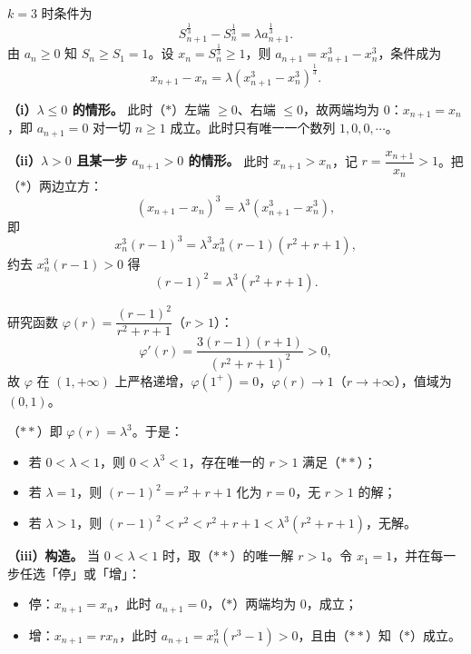 \begin{answer}

$k=3$ 时条件为
\nopagebreak[4]
\[S_{n+1}^{\frac13}-S_n^{\frac13}=\lambda a_{n+1}^{\frac13}.\]
由 $a_n\geqslant0$ 知 $S_n\geqslant S_1=1$。设 $x_n=S_n^{\frac13}\geqslant1$，则 $a_{n+1}=x_{n+1}^3-x_n^3$，条件成为
\nopagebreak[4]
\[x_{n+1}-x_n=\lambda\left(x_{n+1}^3-x_n^3\right)^{\frac13}. \tag{$\ast$}\]

\textbf{（i）$\lambda\leqslant0$ 的情形。} 此时（$\ast$）左端 $\geqslant0$、右端 $\leqslant0$，故两端均为 $0$：$x_{n+1}=x_n$，即 $a_{n+1}=0$ 对一切 $n\geqslant1$ 成立。此时只有唯一一个数列 $1,0,0,\cdots$。

\textbf{（ii）$\lambda>0$ 且某一步 $a_{n+1}>0$ 的情形。} 此时 $x_{n+1}>x_n$，记 $r=\dfrac{x_{n+1}}{x_n}>1$。把（$\ast$）两边立方：
\nopagebreak[4]
\[\left(x_{n+1}-x_n\right)^3=\lambda^3\left(x_{n+1}^3-x_n^3\right),\]
即
\nopagebreak[4]
\[x_n^3(r-1)^3=\lambda^3x_n^3(r-1)\left(r^2+r+1\right),\]
约去 $x_n^3(r-1)>0$ 得
\nopagebreak[4]
\[(r-1)^2=\lambda^3\left(r^2+r+1\right). \tag{$\ast\ast$}\]

研究函数 $\varphi(r)=\dfrac{(r-1)^2}{r^2+r+1}$（$r>1$）：
\nopagebreak[4]
\[\varphi'(r)=\frac{3(r-1)(r+1)}{\left(r^2+r+1\right)^2}>0,\]
故 $\varphi$ 在 $(1,+\infty)$ 上严格递增，$\varphi(1^+)=0$，$\varphi(r)\to1$（$r\to+\infty$），值域为 $(0,1)$。

（$\ast\ast$）即 $\varphi(r)=\lambda^3$。于是：

\begin{itemize}
\item 若 $0<\lambda<1$，则 $0<\lambda^3<1$，存在唯一的 $r>1$ 满足（$\ast\ast$）；
\item 若 $\lambda=1$，则 $(r-1)^2=r^2+r+1$ 化为 $r=0$，无 $r>1$ 的解；
\item 若 $\lambda>1$，则 $(r-1)^2<r^2<r^2+r+1<\lambda^3\left(r^2+r+1\right)$，无解。
\end{itemize}

\textbf{（iii）构造。} 当 $0<\lambda<1$ 时，取（$\ast\ast$）的唯一解 $r>1$。令 $x_1=1$，并在每一步任选「停」或「增」：
\begin{itemize}
\item 停：$x_{n+1}=x_n$，此时 $a_{n+1}=0$，（$\ast$）两端均为 $0$，成立；
\item 增：$x_{n+1}=rx_n$，此时 $a_{n+1}=x_n^3\left(r^3-1\right)>0$，且由（$\ast\ast$）知（$\ast$）成立。
\end{itemize}


\end{answer}
